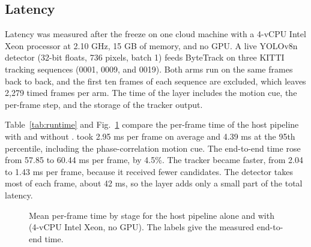 

\subsection{Latency}\label{sec:latency}
\label{sec:latency-setup}Latency was measured after the freeze on one cloud machine with a 4-vCPU
Intel Xeon processor at 2.10 GHz, 15 GB of memory, and no GPU. A live YOLOv8n
detector (32-bit floats, 736 pixels, batch 1) feeds ByteTrack on three KITTI
tracking sequences (0001, 0009, and 0019). Both arms run on the same frames
back to back, and the first ten frames of each sequence are excluded, which
leaves 2,279 timed frames per arm. The time of the layer includes the motion
cue, the per-frame step, and the storage of the tracker output.

Table~\ref{tab:runtime} and Fig.~\ref{fig:runtime} compare the per-frame time
of the host pipeline with and without \scl{}. \scl{} took 2.95 ms per
frame on average and 4.39 ms at the 95th percentile, including the
phase-correlation motion cue. The end-to-end time rose from 57.85 to 60.44 ms
per frame, by 4.5\%. The tracker became faster, from 2.04 to 1.43 ms per
frame, because it received fewer candidates. The detector takes most of each
frame, about 42 ms, so the layer adds only a small part of the total latency.



\begin{figure}[t]
\centering

\caption{Mean per-frame time by stage for the host pipeline alone and with
\scl{} (4-vCPU Intel Xeon, no GPU). The labels give the measured
end-to-end time.}
\label{fig:runtime}
\end{figure}
